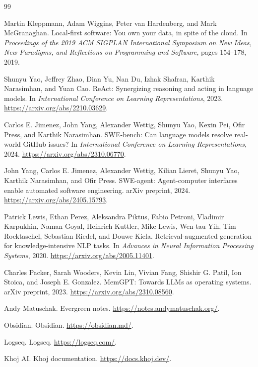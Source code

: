 \documentclass[11pt]{article}
\begin{document}
\begin{thebibliography}{99}

Martin Kleppmann, Adam Wiggins, Peter van Hardenberg, and Mark McGranaghan.
\newblock Local-first software: You own your data, in spite of the cloud.
\newblock In \emph{Proceedings of the 2019 ACM SIGPLAN International Symposium
on New Ideas, New Paradigms, and Reflections on Programming and Software},
pages 154--178, 2019.

Shunyu Yao, Jeffrey Zhao, Dian Yu, Nan Du, Izhak Shafran, Karthik
Narasimhan, and Yuan Cao.
\newblock ReAct: Synergizing reasoning and acting in language models.
\newblock In \emph{International Conference on Learning Representations}, 2023.
\newblock \url{https://arxiv.org/abs/2210.03629}.

Carlos E. Jimenez, John Yang, Alexander Wettig, Shunyu Yao, Kexin Pei,
Ofir Press, and Karthik Narasimhan.
\newblock SWE-bench: Can language models resolve real-world GitHub issues?
\newblock In \emph{International Conference on Learning Representations}, 2024.
\newblock \url{https://arxiv.org/abs/2310.06770}.

John Yang, Carlos E. Jimenez, Alexander Wettig, Kilian Lieret, Shunyu Yao,
Karthik Narasimhan, and Ofir Press.
\newblock SWE-agent: Agent-computer interfaces enable automated software
engineering.
\newblock arXiv preprint, 2024.
\newblock \url{https://arxiv.org/abs/2405.15793}.

Patrick Lewis, Ethan Perez, Aleksandra Piktus, Fabio Petroni, Vladimir
Karpukhin, Naman Goyal, Heinrich Kuttler, Mike Lewis, Wen-tau Yih, Tim
Rocktaschel, Sebastian Riedel, and Douwe Kiela.
\newblock Retrieval-augmented generation for knowledge-intensive NLP tasks.
\newblock In \emph{Advances in Neural Information Processing Systems}, 2020.
\newblock \url{https://arxiv.org/abs/2005.11401}.

Charles Packer, Sarah Wooders, Kevin Lin, Vivian Fang, Shishir G. Patil,
Ion Stoica, and Joseph E. Gonzalez.
\newblock MemGPT: Towards LLMs as operating systems.
\newblock arXiv preprint, 2023.
\newblock \url{https://arxiv.org/abs/2310.08560}.

Andy Matuschak.
\newblock Evergreen notes.
\newblock \url{https://notes.andymatuschak.org/}.

Obsidian.
\newblock Obsidian.
\newblock \url{https://obsidian.md/}.

Logseq.
\newblock Logseq.
\newblock \url{https://logseq.com/}.

Khoj AI.
\newblock Khoj documentation.
\newblock \url{https://docs.khoj.dev/}.

\end{thebibliography}
\end{document}

